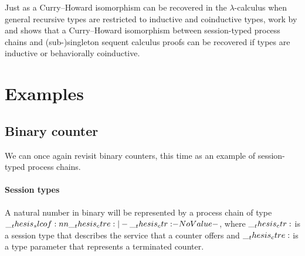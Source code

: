 Just as a Curry--Howard isomorphism can be recovered in the $\lambda$-calculus when general recursive types are restricted to inductive and coinductive types, work by  and  shows that a Curry--Howard isomorphism between session-typed process chains and (sub-)singleton sequent calculus proofs can be recovered if types are inductive or behaviorally coinductive.


\section{Examples}\label{sec:process-chains:examples}

\subsection{Binary counter}\label{sec:process-chains:binary-counter}

We can once again revisit binary counters, this time as an example of session-typed process chains.

\paragraph*{Session types}

A natural number in binary will be represented by a process chain of type $\slcof{\ctre |- \ctr}$, where $\__thesis_ctr:$ is a session type that 
describes the service that a counter offers
and $\__thesis_ctre:$ is a type parameter that represents a terminated counter.

